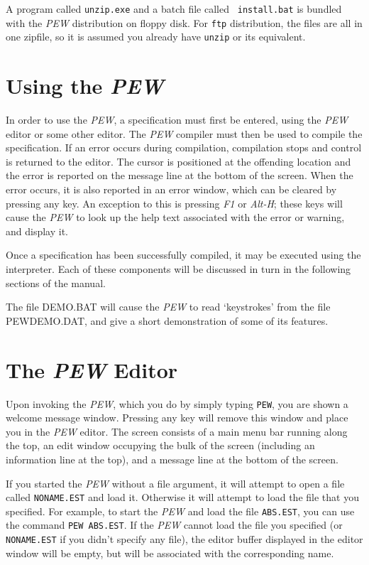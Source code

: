 A program called {\tt unzip.exe} and a batch file called {\tt
install.bat} is bundled with the {\em PEW} distribution on floppy
disk. For {\tt ftp} distribution, the files are all in one zipfile,
so it is assumed you already have {\tt unzip} or its equivalent.

\newpage
\section[Using the {\em PEW}]{Using the {\em PEW}}

In order  to use  the {\em PEW},  a  specification  must  first  be
entered, using  the {\em PEW} editor or  some other  editor. The {\em
PEW} compiler must  then be  used to compile the specification. If an
error occurs  during compilation,  compilation stops and control
is returned  to the  editor. The  cursor is  positioned  at  the
offending location and the error is reported on the message line
at the bottom of the screen. When the error occurs, it is also
reported in an error window, which can be cleared by pressing any
key. An exception to this is pressing {\em F1} or {\em Alt-H}; these
keys will cause the {\em PEW} to look up the help text associated
with the error or warning, and display it.

Once a  specification has  been successfully compiled, it may be
executed using  the interpreter. Each of these components will be
discussed in turn in the following sections of the manual.

The file DEMO.BAT will cause the {\em PEW} to read `keystrokes' from
the file PEWDEMO.DAT, and give a short demonstration of some of its
features.

\newpage
\section[The {\em PEW} Editor]{The {\em PEW} Editor}

Upon invoking  the {\em PEW}, which you do by simply typing {\tt PEW},
you are shown a welcome message window.
Pressing any  key will  remove this  window and place you in the
{\em PEW} editor. The screen consists of a main menu bar running along
the top,  an edit  window  occupying  the  bulk  of  the  screen
(including an  information line  at the top), and a message line
at the bottom of the screen.

If you  started the {\em PEW} without a file argument, it will attempt
to open  a file called {\tt NONAME.EST} and load it. Otherwise it will
attempt to  load the  file that you specified. For example, to start
the {\em PEW} and load the file {\tt ABS.EST}, you can use the
command {\tt PEW ABS.EST}. If the {\em PEW} cannot load
the file you specified (or {\tt NONAME.EST} if you didn't specify any
file), the editor buffer displayed in the editor window will be
empty, but will be associated with the corresponding name.

